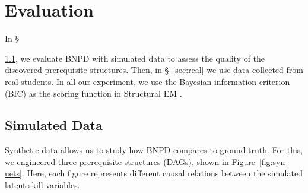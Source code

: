 \documentclass{edm_template}
\begin{document}
\section{Evaluation}
In \S~{\ref{sec:synthetic}, we  evaluate BNPD with simulated data  to assess the quality of the discovered prerequisite structures.
Then, in \S~\ref{sec:real} we  use  data collected from real students.
In all our experiment, we use the Bayesian information criterion (BIC) as the scoring function in Structural EM . 

	\subsection{Simulated Data}
	\label{sec:synthetic}
	
	Synthetic data allows us to study how BNPD compares to ground truth.
	For this, we engineered three prerequisite structures (DAGs), shown in Figure~\ref{fig:syn-nets}.
	Here, each figure represents different causal relations between the simulated latent skill variables.
	
}
\end{document}
